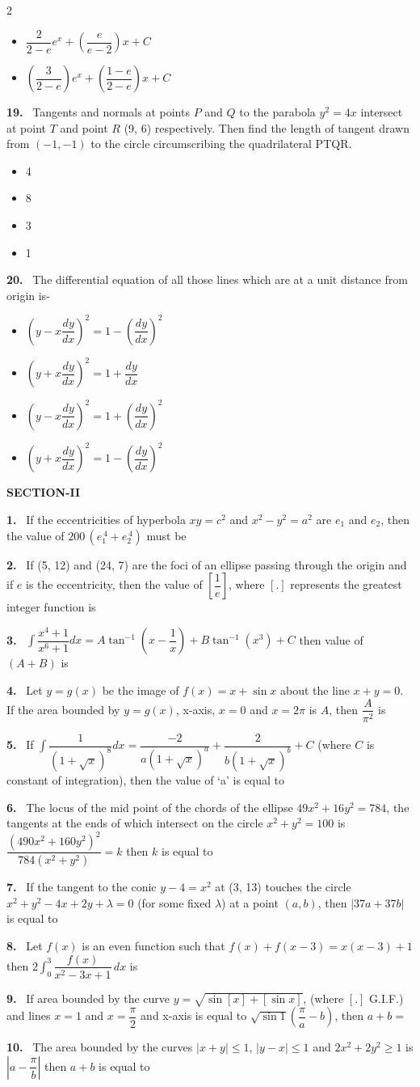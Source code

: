 \documentclass[10pt]{extarticle}
\newcommand{\sect}[1]{\par\smallskip\noindent\textbf{#1}\par}
\newcommand{\qn}[1]{\par\smallskip\noindent\textbf{#1.}~}
\newenvironment{qoptions}{\begin{itemize}[leftmargin=1.8em,itemsep=1pt,topsep=2pt,label={}]}{\end{itemize}}
\newcommand{\opt}[2]{\item[(#1)] #2}
\begin{document}
\begin{multicols}{2}
\begin{qoptions}
\opt{C}{$\dfrac{2}{2-e}e^x+\left(\dfrac{e}{e-2}\right)x+C$}
\opt{D}{$\left(\dfrac{3}{2-e}\right)e^x+\left(\dfrac{1-e}{2-e}\right)x+C$}
\end{qoptions}
\qn{19} Tangents and normals at points $P$ and $Q$ to the parabola $y^2=4x$ intersect at point $T$ and point $R$ (9, 6) respectively. Then find the length of tangent drawn from $(-1,-1)$ to the circle circumscribing the quadrilateral PTQR.
\begin{qoptions}
\opt{A}{4}
\opt{B}{8}
\opt{C}{3}
\opt{D}{1}
\end{qoptions}
\qn{20} The differential equation of all those lines which are at a unit distance from origin is-
\begin{qoptions}
\opt{A}{$\left(y-x\dfrac{dy}{dx}\right)^2=1-\left(\dfrac{dy}{dx}\right)^2$}
\opt{B}{$\left(y+x\dfrac{dy}{dx}\right)^2=1+\dfrac{dy}{dx}$}
\opt{C}{$\left(y-x\dfrac{dy}{dx}\right)^2=1+\left(\dfrac{dy}{dx}\right)^2$}
\opt{D}{$\left(y+x\dfrac{dy}{dx}\right)^2=1-\left(\dfrac{dy}{dx}\right)^2$}
\end{qoptions}
\sect{SECTION-II}
\qn{1} If the eccentricities of hyperbola $xy=c^2$ and $x^2-y^2=a^2$ are $e_1$ and $e_2$, then the value of $200\,(e_1^{\,4}+e_2^{\,4})$ must be \underline{\hspace{1cm}}
\qn{2} If (5, 12) and (24, 7) are the foci of an ellipse passing through the origin and if $e$ is the eccentricity, then the value of $\left[\dfrac1e\right]$, where $[.]$ represents the greatest integer function is \underline{\hspace{1cm}}
\qn{3} $\displaystyle\int\dfrac{x^4+1}{x^6+1}dx=A\tan^{-1}\left(x-\dfrac1x\right)+B\tan^{-1}\left(x^3\right)+C$ then value of $(A+B)$ is
\qn{4} Let $y=g(x)$ be the image of $f(x)=x+\sin x$ about the line $x+y=0$. If the area bounded by $y=g(x)$, x-axis, $x=0$ and $x=2\pi$ is $A$, then $\dfrac{A}{\pi^2}$ is
\qn{5} If $\displaystyle\int\dfrac{1}{\left(1+\sqrt x\right)^8}dx=\dfrac{-2}{a\left(1+\sqrt x\right)^a}+\dfrac{2}{b\left(1+\sqrt x\right)^b}+C$ (where $C$ is constant of integration), then the value of `a' is equal to
\qn{6} The locus of the mid point of the chords of the ellipse $49x^2+16y^2=784$, the tangents at the ends of which intersect on the circle $x^2+y^2=100$ is $\dfrac{(490x^2+160y^2)^2}{784(x^2+y^2)}=k$ then $k$ is equal to
\qn{7} If the tangent to the conic $y-4=x^2$ at (3, 13) touches the circle $x^2+y^2-4x+2y+\lambda=0$ (for some fixed $\lambda$) at a point $(a,b)$, then $|37a+37b|$ is equal to
\qn{8} Let $f(x)$ is an even function such that $f(x)+f(x-3)=x(x-3)+1$ then $2\displaystyle\int_0^3\dfrac{f(x)}{x^2-3x+1}\,dx$ is
\qn{9} If area bounded by the curve $y=\sqrt{\sin[x]+[\sin x]}$, (where $[.]$ G.I.F.) and lines $x=1$ and $x=\dfrac\pi2$ and x-axis is equal to $\sqrt{\sin1}\left(\dfrac\pi a-b\right)$, then $a+b=$
\qn{10} The area bounded by the curves $|x+y|\le1$, $|y-x|\le1$ and $2x^2+2y^2\ge1$ is $\left|a-\dfrac\pi b\right|$ then $a+b$ is equal to
\end{multicols}
\end{document}
